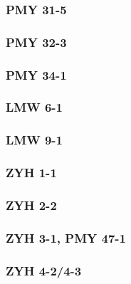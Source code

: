 \documentclass[12pt, a4paper,titlepage]{article}
\begin{document}
{%


\subsubsection*{PMY 31-5}

\subsubsection*{PMY 32-3}

\subsubsection*{PMY 34-1}


\subsubsection*{LMW 6-1}

\subsubsection*{LMW 9-1}

\subsubsection*{ZYH 1-1}

\subsubsection*{ZYH 2-2}

\subsubsection*{ZYH 3-1, PMY 47-1}

\subsubsection*{ZYH 4-2/4-3}

}
\end{document}
